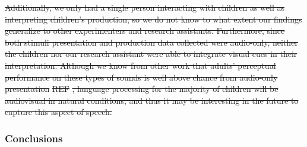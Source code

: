 \documentclass[english,,man,floatsintext]{apa6} %
\providecommand{\DIFdeltex}[1]{{\protect\color{red}\sout{#1}}}                      %
\providecommand{\DIFdelend}{} %
\providecommand{\DIFdel}[1]{\texorpdfstring{\DIFdeltex{#1}}{}} %
\DeclareRobustCommand{\DIFdelend}{\DIFOaddend \let\includegraphics\DIFOincludegraphics} %
\begin{document}
\DIFdel{Additionally, we only had a single person interacting with children as well as interpreting children's production, so we do not know to what extent our findings generalize to other experimenters and research assistants. Furthermore, since both stimuli presentation and production data collected were audio-only, neither the children nor our research assistant were able to integrate visual cues in their interpretation. Although we know from other work that adults' perceptual performance on these types of sounds is well above chance from audio-only presentation }%
\DIFdel{REF}%
\DIFdel{, language processing for the majority of children will be audiovisual in natural conditions, and thus it may be interesting in the future to capture this aspect of speech.
}%

\DIFdelend \hypertarget{conclusions}{%
	\subsubsection{Conclusions}\label{conclusions}}
\end{document}
